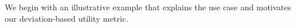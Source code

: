 We begin with an illustrative example that explains the \SeeDB use case and motivates our deviation-based
utility metric. 





